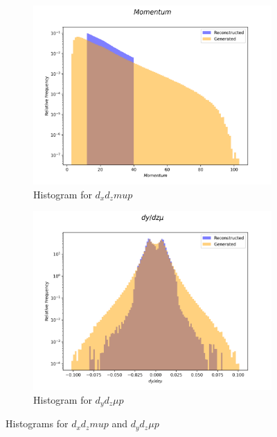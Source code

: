 \documentclass{article}
\begin{document}
\begin{figure}[H]
    \centering
    \begin{subfigure}[b]{0.45\textwidth}
        \includegraphics[width=\textwidth]{graphs/hadr_Momentum.png}
        \caption{Histogram for $d_xd_zmup$}
        \label{fig:had_Angle_mu_2}
    \end{subfigure}
    \hfill
    \begin{subfigure}[b]{0.45\textwidth}
        \includegraphics[width=\textwidth]{graphs/hadr_dy_dz_mu.png}
        \caption{Histogram for $d_yd_z \mu p$}
        \label{fig:had_Angle_u_3}
    \end{subfigure}
    \caption{Histograms for $d_xd_zmup$ and $d_yd_z \mu p$}
\end{figure}
\end{document}
